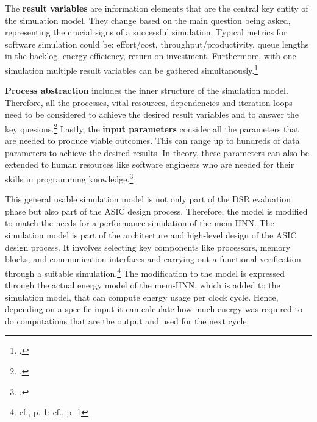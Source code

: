 The \textbf{result variables} are information elements that are the central key entity of the simulation model. 
They change based on the main question being asked, representing the crucial signs of a successful simulation.
Typical metrics for software simulation could be: effort/cost, throughput/productivity, queue lengths in the backlog,
energy efficiency, return on investment.
Furthermore, with one simulation multiple result variables can be gathered simultanously.\footcite[cf.][96-97]{kellnerSoftwareProcessSimulation1999}

\textbf{Process abstraction} includes the inner structure of the simulation model.
Therefore, all the processes, vital resources, dependencies and iteration loops need to be considered to achieve the desired result variables and to answer the key quesions.\footcite[cf.][97]{kellnerSoftwareProcessSimulation1999}
Lastly, the \textbf{input parameters} consider all the parameters that are needed to produce viable outcomes. 
This can range up to hundreds of data parameters to achieve the desired results. 
In theory, these parameters can also be extended to human resources like software engineers who are needed for their skills in programming knowledge.\footcite[cf.][97-98]{kellnerSoftwareProcessSimulation1999}

This general usable simulation model is not only part of the \ac{DSR} evaluation phase but also part of the \ac{ASIC} design process. 
Therefore, the model is modified to match the needs for a performance simulation of the \ac{mem-HNN}.
The simulation model is part of the architecture and high-level design of the \ac{ASIC} design process.
It involves selecting key components like processors, memory blocks, and communication interfaces and carrying out a functional verification through a suitable simulation.\footnote{cf.\cite{raoUltimateGuideASIC}, p. 1; cf.\cite{ASICDesignFlow}, p. 1}
The modification to the model is expressed through the actual energy model of the \ac{mem-HNN}, which is added to the simulation model, that can compute energy usage per clock cycle. 
Hence, depending on a specific input it can calculate how much energy was required to do computations that are the output and used for the next cycle. 
